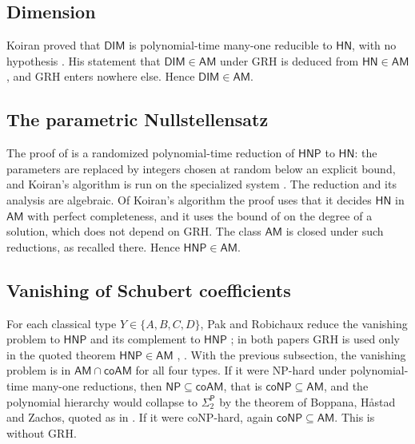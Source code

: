 \documentclass[11pt]{amsart}
\theoremstyle{definition}
\theoremstyle{remark}
\newcommand{\cl}[1]{\mathsf{#1}}
\newcommand{\HN}{\cl{HN}}
\newcommand{\AM}{\cl{AM}}
\newcommand{\Sigtwo}{\Sigma_2^{\cl P}}
\begin{document}
\subsection{Dimension}
Koiran proved that $\cl{DIM}$ is polynomial-time many-one reducible to $\HN$, with no hypothesis \cite[Theorem~5.8, p.~9]{K97}. His statement that $\cl{DIM}\in\AM$ under GRH \cite[Theorem~4.1, p.~6]{K97} is deduced from $\HN\in\AM$ \cite{K96b}, and GRH enters nowhere else. Hence $\cl{DIM}\in\AM$.

\subsection{The parametric Nullstellensatz}
The proof of \cite[Theorem~1]{A24} is a randomized polynomial-time reduction of $\cl{HNP}$ to $\HN$: the parameters are replaced by integers chosen at random below an explicit bound, and Koiran's algorithm is run on the specialized system \cite[\S3.4, pp.~8--9]{A24}. The reduction and its analysis are algebraic. Of Koiran's algorithm the proof uses that it decides $\HN$ in $\AM$ with perfect completeness, and it uses the bound of \cite[Theorem~7]{K96b} on the degree of a solution, which does not depend on GRH. The class $\AM$ is closed under such reductions, as recalled there. Hence $\cl{HNP}\in\AM$.

\subsection{Vanishing of Schubert coefficients}
For each classical type $Y\in\{A,B,C,D\}$, Pak and Robichaux reduce the vanishing problem to $\cl{HNP}$ \cite[Lemma~3.2 and proof of Theorem~3.4]{PR25} and its complement to $\cl{HNP}$ \cite[Lemma~1.9]{PR24b}; in both papers GRH is used only in the quoted theorem $\cl{HNP}\in\AM$ \cite[Theorem~3.1]{PR25}, \cite[Theorem~1.8]{PR24b}. With the previous subsection, the vanishing problem is in $\AM\cap\cl{coAM}$ for all four types. If it were NP-hard under polynomial-time many-one reductions, then $\cl{NP}\subseteq\cl{coAM}$, that is $\cl{coNP}\subseteq\AM$, and the polynomial hierarchy would collapse to $\Sigtwo$ by the theorem of Boppana, H\aa stad and Zachos, quoted as \cite[Theorem~2.3]{BHZ} in \cite[p.~5]{PR25}. If it were coNP-hard, again $\cl{coNP}\subseteq\AM$. This is \cite[Corollary~1.4]{PR25} without GRH.
\end{document}
